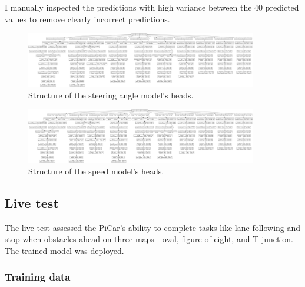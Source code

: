 \documentclass{article}
\begin{document}
I manually inspected the predictions with high variance between the 40 predicted values to remove clearly incorrect predictions.



\begin{figure}[h]
  \centering
  \includegraphics[width=0.9\textwidth]{figures/angle_heads.png}
  \caption{Structure of the steering angle model's heads.}
  \label{fig:angle_heads}
\end{figure}

\begin{figure}[h]
  \centering
  \includegraphics[width=0.9\textwidth]{figures/speed_heads.png}
  \caption{Structure of the speed model's heads.}
  \label{fig:speed_heads}
\end{figure}


\subsection{Live test}

The live test assessed the PiCar’s ability to complete tasks like lane following and stop when obstacles ahead on three maps - oval, figure-of-eight, and T-junction. The trained model was deployed.

\subsubsection{Training data}
\end{document}
